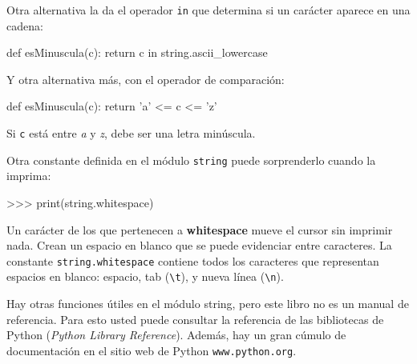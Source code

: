 Otra alternativa la da el operador \texttt{in} que determina si un
carácter aparece en una cadena:
\begin{pythoncode}
def esMinuscula(c):
  return c in string.ascii_lowercase
\end{pythoncode}
 Y otra alternativa más, con el operador de comparación:
\begin{pythoncode}
def esMinuscula(c):
  return 'a' <= c <= 'z'
\end{pythoncode}

Si \texttt{c} está entre {\em a} y {\em z}, debe ser una letra
minúscula.

Otra constante definida en el módulo \texttt{string} puede sorprenderlo
cuando la imprima:
\begin{pyconcode}
>>> print(string.whitespace)
\end{pyconcode}

Un carácter de los que pertenecen a \textbf{whitespace} mueve el cursor
sin imprimir nada. Crean un espacio en blanco que se puede evidenciar
entre caracteres. La constante \texttt{string.whitespace} contiene
todos los caracteres que representan espacios en blanco: espacio,
tab (\verb+\t+), y nueva línea (\verb+\n+).

 

Hay otras funciones útiles en el módulo string, pero este libro no
es un manual de referencia. Para esto usted puede consultar la referencia
de las bibliotecas de Python ({\em Python Library Reference}).
Además, hay un gran cúmulo de documentación en el sitio web de Python
\texttt{www.python.org}.



